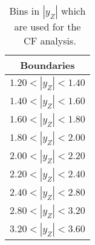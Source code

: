 \begin{table}
\centering
\begin{tabular}{c}
\hline\hline
Boundaries\\\hline
$1.20 < |y_{Z}| <1.40$\\
$1.40 < |y_{Z}| <1.60$\\
$1.60 < |y_{Z}| <1.80$\\
$1.80 < |y_{Z}| <2.00$\\
$2.00 < |y_{Z}| <2.20$\\
$2.20 < |y_{Z}| <2.40$\\
$2.40 < |y_{Z}| <2.80$\\
$2.80 < |y_{Z}| <3.20$\\
$3.20 < |y_{Z}| <3.60$\\
\hline\hline
\end{tabular}
\caption{Bins in $|y_{Z}|$ which are used for the \Zee\ CF analysis.}
\label{tab:ZeeCS_bins}
\end{table}
